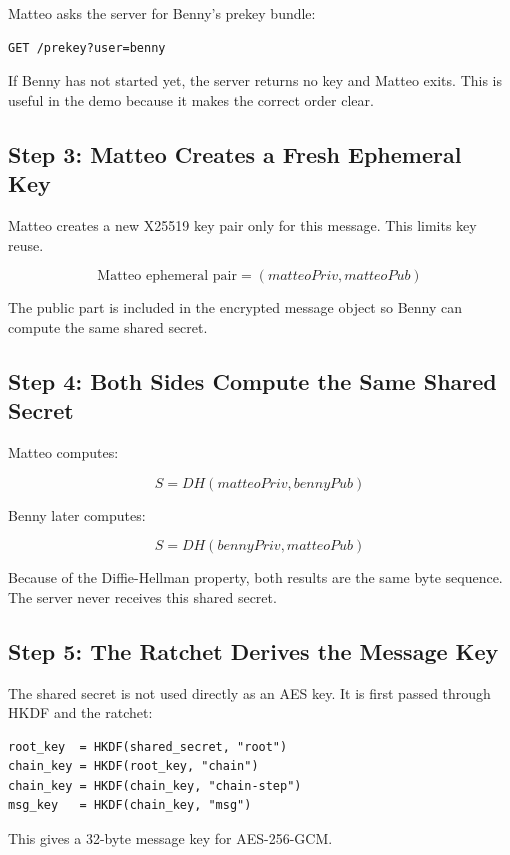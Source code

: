 \documentclass[12pt,a4paper]{article}
\begin{document}
Matteo asks the server for Benny's prekey bundle:

\begin{lstlisting}[style=output]
GET /prekey?user=benny
\end{lstlisting}

If Benny has not started yet, the server returns no key and Matteo exits. This is useful in the demo because it makes the correct order clear.

\subsection{Step 3: Matteo Creates a Fresh Ephemeral Key}

Matteo creates a new X25519 key pair only for this message. This limits key reuse.

\[
\text{Matteo ephemeral pair} = (matteoPriv, matteoPub)
\]

The public part is included in the encrypted message object so Benny can compute the same shared secret.

\subsection{Step 4: Both Sides Compute the Same Shared Secret}

Matteo computes:

\[
S = DH(matteoPriv, bennyPub)
\]

Benny later computes:

\[
S = DH(bennyPriv, matteoPub)
\]

Because of the Diffie-Hellman property, both results are the same byte sequence. The server never receives this shared secret.

\subsection{Step 5: The Ratchet Derives the Message Key}

The shared secret is not used directly as an AES key. It is first passed through HKDF and the ratchet:

\begin{lstlisting}[style=output]
root_key  = HKDF(shared_secret, "root")
chain_key = HKDF(root_key, "chain")
chain_key = HKDF(chain_key, "chain-step")
msg_key   = HKDF(chain_key, "msg")
\end{lstlisting}

This gives a 32-byte message key for AES-256-GCM.
\end{document}

